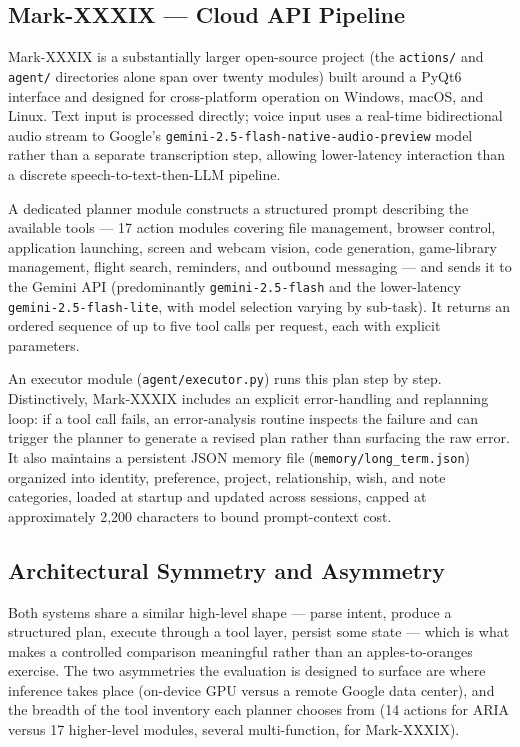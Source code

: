 \documentclass[conference]{IEEEtran}
\begin{document}
\subsection{Mark-XXXIX --- Cloud API Pipeline}

Mark-XXXIX is a substantially larger open-source project (the \texttt{actions/} and \texttt{agent/} directories alone span over twenty modules) built around a PyQt6 interface and designed for cross-platform operation on Windows, macOS, and Linux. Text input is processed directly; voice input uses a real-time bidirectional audio stream to Google's \texttt{gemini-2.5-flash-native-audio-preview} model rather than a separate transcription step, allowing lower-latency interaction than a discrete speech-to-text-then-LLM pipeline.

A dedicated planner module constructs a structured prompt describing the available tools --- 17 action modules covering file management, browser control, application launching, screen and webcam vision, code generation, game-library management, flight search, reminders, and outbound messaging --- and sends it to the Gemini API (predominantly \texttt{gemini-2.5-flash} and the lower-latency \texttt{gemini-2.5-flash-lite}, with model selection varying by sub-task). It returns an ordered sequence of up to five tool calls per request, each with explicit parameters.

An executor module (\texttt{agent/executor.py}) runs this plan step by step. Distinctively, Mark-XXXIX includes an explicit error-handling and replanning loop: if a tool call fails, an error-analysis routine inspects the failure and can trigger the planner to generate a revised plan rather than surfacing the raw error. It also maintains a persistent JSON memory file (\texttt{memory/long\_term.json}) organized into identity, preference, project, relationship, wish, and note categories, loaded at startup and updated across sessions, capped at approximately 2,200 characters to bound prompt-context cost.

\subsection{Architectural Symmetry and Asymmetry}

Both systems share a similar high-level shape --- parse intent, produce a structured plan, execute through a tool layer, persist some state --- which is what makes a controlled comparison meaningful rather than an apples-to-oranges exercise. The two asymmetries the evaluation is designed to surface are where inference takes place (on-device GPU versus a remote Google data center), and the breadth of the tool inventory each planner chooses from (14 actions for ARIA versus 17 higher-level modules, several multi-function, for Mark-XXXIX).
\end{document}
